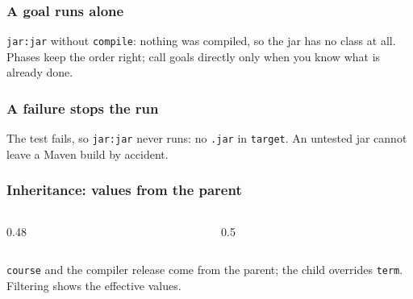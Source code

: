 \documentclass[aspectratio=169,10pt,compress]{beamer}
\begin{document}
\begin{frame}[t,fragile] \frametitle{A goal runs alone}

  \vspace{0.1em}
  \small
  \texttt{jar:jar} without \texttt{compile}: nothing was compiled, so the jar has no class at all. Phases keep the order right; call goals directly only when you know what is already done.
\end{frame}




\begin{frame}[t,fragile] \frametitle{A failure stops the run}

  \vspace{0.1em}
  \small
  The test fails, so \texttt{jar:jar} never runs: no \texttt{.jar} in \texttt{target}. An untested jar cannot leave a Maven build by accident.
\end{frame}





\begin{frame}[t,fragile] \frametitle{Inheritance: values from the parent}
  \begin{columns}[T]
    \begin{column}{0.48\textwidth}
    \end{column}
    \begin{column}{0.5\textwidth}
    \end{column}
  \end{columns}
  \vspace{0.2em}
  \small \texttt{course} and the compiler release come from the parent; the child overrides \texttt{term}. Filtering shows the effective values.
\end{frame}
\end{document}
